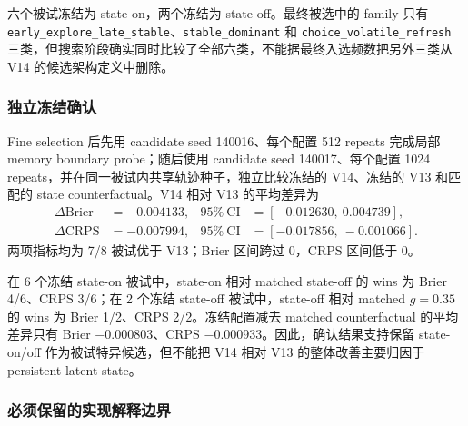 六个被试冻结为 state-on，两个冻结为 state-off。最终被选中的 family 只有 \texttt{early\_explore\_late\_stable}、\texttt{stable\_dominant} 和 \texttt{choice\_volatile\_refresh} 三类，但搜索阶段确实同时比较了全部六类，不能据最终入选频数把另外三类从 V14 的候选架构定义中删除。


\subsubsection{独立冻结确认}

Fine selection 后先用 candidate seed 140016、每个配置 512 repeats 完成局部 memory boundary probe；随后使用 candidate seed 140017、每个配置 1024 repeats，并在同一被试内共享轨迹种子，独立比较冻结的 V14、冻结的 V13 和匹配的 state counterfactual。V14 相对 V13 的平均差异为
\begin{align}
    \Delta\mathrm{Brier}
    &=-0.004133,
    &95\%\ \mathrm{CI}
    &=[-0.012630,\ 0.004739],\\
    \Delta\mathrm{CRPS}
    &=-0.007994,
    &95\%\ \mathrm{CI}
    &=[-0.017856,\ -0.001066].
    \label{eq:modelv14-confirmation}
\end{align}
两项指标均为 7/8 被试优于 V13；Brier 区间跨过 0，CRPS 区间低于 0。

在 6 个冻结 state-on 被试中，state-on 相对 matched state-off 的 wins 为 Brier 4/6、CRPS 3/6；在 2 个冻结 state-off 被试中，state-off 相对 matched $g=0.35$ 的 wins 为 Brier 1/2、CRPS 2/2。冻结配置减去 matched counterfactual 的平均差异只有 Brier $-0.000803$、CRPS $-0.000933$。因此，确认结果支持保留 state-on/off 作为被试特异候选，但不能把 V14 相对 V13 的整体改善主要归因于 persistent latent state。


\subsubsection{必须保留的实现解释边界}

